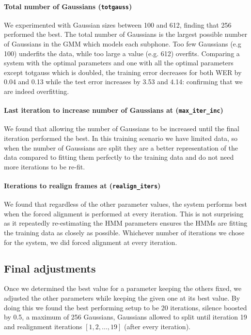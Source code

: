 \documentclass[twocolumn, 11pt]{article}
\begin{document}
\paragraph{Total number of Gaussians (\texttt{totgauss})} We experimented with
Gaussian sizes between 100 and 612, finding that 256 performed the best. The
total number of Gaussians is the largest possible number of Gaussians in the GMM
which models each subphone. Too few Gaussians (e.g 100) underfits the data,
while too large a value (e.g. 612) overfits. Comparing a system with the optimal
parameters and one with all the optimal parameters except totgauss which is
doubled, the training error decreases for both WER by 0.04 and 0.13 while the
test error increases by 3.53 and 4.14: confirming that we are indeed
overfitting.

\paragraph{Last iteration to increase number of Gaussians at
(\texttt{max\_iter\_inc})} We found that allowing the number of Gaussians to
be increased until the final iteration performed the best. In this training
scenario we have limited data, so when the number of Gaussians are split they
are a better representation of the data compared to fitting them perfectly to
the training data and do not need more iterations to be re-fit.

\paragraph{Iterations to realign frames at (\texttt{realign\_iters})} We found
that regardless of the other parameter values, the system performs best when the
forced alignment is performed at every iteration. This is not surprising as it
repeatedly re-estimating the HMM parameters ensures the HMMs are fitting the
training data as closely as possible. Whichever number of iterations we chose
for the system, we did forced alignment at every iteration.

\subsection{Final adjustments}
Once we determined the best value for a parameter keeping the others fixed, we
adjusted the other parameters while keeping the given one at its best value.
By doing this we found the best performing setup to be  20 iterations, silence boosted by 0.5, a maximum of 256 Gaussians, Gaussians allowed to split until iteration 19 and realignment iterations $[1, 2, \ldots, 19]$ (after every iteration).
\end{document}
